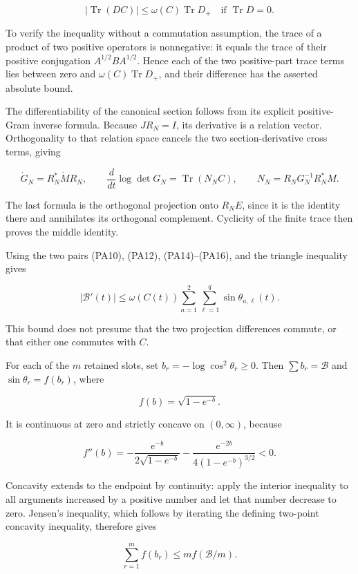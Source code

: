 \[
|\operatorname{Tr}(DC)|
\le\omega(C)\operatorname{Tr}D_+
\quad\text{if }\operatorname{Tr}D=0.
\tag{PA15}
\]

To verify the inequality without a commutation assumption, the trace of a product of two positive operators is nonnegative: it equals the trace of their positive conjugation \(A^{1/2}BA^{1/2}\). Hence each of the two positive-part trace terms lies between zero and \(\omega(C)\operatorname{Tr}D_+\), and their difference has the asserted absolute bound.

The differentiability of the canonical section follows from its explicit positive-Gram inverse formula. Because \(JR_N=I\), its derivative is a relation vector. Orthogonality to that relation space cancels the two section-derivative cross terms, giving

\[
\dot G_N=R_N^*\dot M R_N,
\qquad
\frac{d}{dt}\log\det G_N
=\operatorname{Tr}(N_NC),
\qquad N_N=R_NG_N^{-1}R_N^*M.
\tag{PA16}
\]

The last formula is the orthogonal projection onto \(R_NE\), since it is the identity there and annihilates its orthogonal complement. Cyclicity of the finite trace then proves the middle identity.

Using the two pairs (PA10), (PA12), (PA14)--(PA16), and the triangle inequality gives

\[
\boxed{
|\mathcal B'(t)|
\le \omega(C(t))\sum_{a=1}^2\sum_{\ell=1}^q
                  \sin\theta_{a,\ell}(t).
}
\tag{PA17}
\]

This bound does not presume that the two projection differences commute, or that either one commutes with \(C\).

For each of the \(m\) retained slots, set \(b_r=-\log\cos^2\theta_r\ge0\). Then \(\sum b_r=\mathcal B\) and \(\sin\theta_r=f(b_r)\), where

\[
f(b)=\sqrt{1-e^{-b}}.
\tag{PA18}
\]

It is continuous at zero and strictly concave on \((0,\infty)\), because

\[
f''(b)=-\frac{e^{-b}}{2\sqrt{1-e^{-b}}}
        -\frac{e^{-2b}}{4(1-e^{-b})^{3/2}}<0.
\]

Concavity extends to the endpoint by continuity: apply the interior inequality to all arguments increased by a positive number and let that number decrease to zero. Jensen's inequality, which follows by iterating the defining two-point concavity inequality, therefore gives

\[
\sum_{r=1}^m f(b_r)\le m f(\mathcal B/m).
\]

